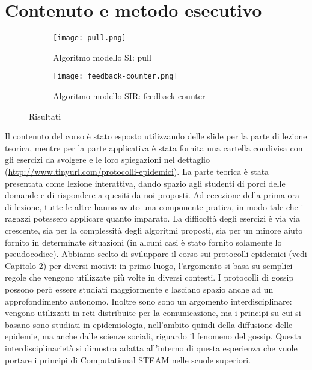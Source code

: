 \section{Contenuto e metodo esecutivo} 
\begin{figure}[!h]
    
    \begin{subfigure}{.4\textwidth}
        \centering
        \texttt{[image: pull.png]}
        \captionsetup{justification=centering}
        \caption{Algoritmo modello SI: pull} 
    \end{subfigure}\hfill
    \begin{subfigure}{.4\textwidth}
        \centering
        \texttt{[image: feedback-counter.png]}
        \captionsetup{justification=centering}
        \caption{Algoritmo modello SIR: feedback-counter} 
    \end{subfigure}
    \caption{Risultati}
\end{figure} 
Il contenuto del corso è stato esposto utilizzando delle slide per la parte di lezione teorica, mentre per la parte applicativa è stata fornita una cartella condivisa con gli esercizi da svolgere e le loro spiegazioni nel dettaglio (\href{http://www.tinyurl.com/protocolli-epidemici}{http://www.tinyurl.com/protocolli-epidemici}). La parte teorica è stata presentata come lezione interattiva, dando spazio agli studenti di porci delle domande e di rispondere a quesiti da noi proposti. Ad eccezione della prima ora di lezione, tutte le altre hanno avuto una componente pratica, in modo tale che i ragazzi potessero applicare quanto imparato. La difficoltà degli esercizi è via via crescente, sia per la complessità degli algoritmi proposti, sia per un minore aiuto fornito in determinate situazioni (in alcuni casi è stato fornito solamente lo pseudocodice). 
Abbiamo scelto di sviluppare il corso sui protocolli epidemici (vedi Capitolo 2) per diversi motivi: in primo luogo, l’argomento si basa su semplici regole che vengono utilizzate più volte in diversi contesti. I protocolli di gossip possono però essere studiati maggiormente e lasciano spazio anche ad un approfondimento autonomo. Inoltre sono sono un argomento interdisciplinare: vengono utilizzati in reti distribuite per la comunicazione, ma i principi su cui si basano sono studiati in epidemiologia, nell’ambito quindi della diffusione delle epidemie, ma anche dalle scienze sociali, riguardo il fenomeno del gossip. Questa interdisciplinarietà si dimostra adatta all’interno di questa esperienza che vuole portare i principi di Computational STEAM nelle scuole superiori.
